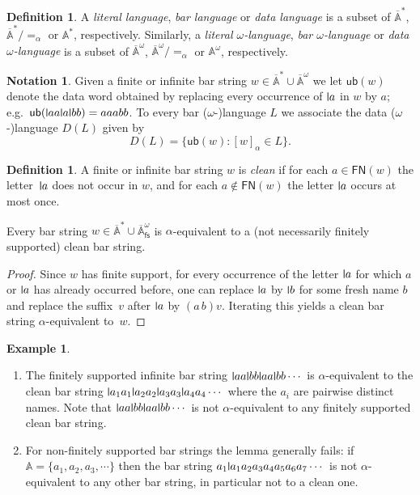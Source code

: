 \documentclass[10pt,a4paper]{amsart}
\newcommand{\midmid}{\hspace{0.2ex}{\rule[-0.1ex]{0.6pt}{1.65ex}}\hspace{0.2ex}}
\newcommand{\compr}{:}
\newcommand{\newletter}[1]{{\midmid}#1}
\newcommand{\free}[1]{\mathsf{FN}(#1)}
\newcommand{\barA}{\overline{\names}}
\newcommand{\ub}{\mathsf{ub}}
\numberwithin{equation}{section}
\newcommand{\fs}{\mathsf{fs}}
\newcommand{\+}[1]{\mathcal{#1}\xspace}
\newcommand{\names}{\mathbb{A}}
\theoremstyle{definition}
\newtheorem{defn}[theorem]{Definition}
\newtheorem{expl}[theorem]{Example}
\newtheorem{nota}[theorem]{Notation}
\begin{document}
\begin{defn}
  A \emph{literal language}, \emph{bar language} or \emph{data
    language} is a subset of $\barA^*$, $\barA^*/{=_\alpha}$ or
  $\names^*$, respectively.  Similarly, a \emph{literal
    $\omega$-language}, \emph{bar $\omega$-language} or \emph{data
    $\omega$-language} is a subset of $\barA^\omega$,
  $\barA^\omega/{=_\alpha}$ or $\names^\omega$, respectively.
\end{defn}
%
\begin{nota}\label{not:local-semantics}
  Given a finite or infinite bar string
  $w\in \barA^*\cup \barA^\omega$ we let $\ub(w)$ denote the data word
  obtained by replacing every occurrence of $\newletter a$ in $w$ by $a$; e.g.\
  $\ub(\newletter aa\newletter a\newletter bb)=aaabb$. To every bar ($\omega$-)language $L$ we associate the data
  ($\omega$-)language $D(L)$ given by
  \[
    D(L) = \{ \ub(w) \compr [w]_\alpha \in L \}.
  \]
\end{nota}
%
\begin{defn}\label{D:clean}
  A finite or infinite bar string $w$ is \emph{clean} if for each
  $a\in \free{w}$ the letter~$\newletter a$ does not occur in $w$, and for each
  $a\not\in \free{w}$ the letter $\newletter a$ occurs at most once.
\end{defn}
%
\begin{lemma}\label{lem:clean}
  Every bar string $w\in \barA^*\cup \barA^\omega_\fs$ is $\alpha$-equivalent to a (not necessarily finitely supported) clean bar string.
\end{lemma}
%
\begin{proof}
  Since $w$ has finite support, for every occurrence of the letter
  $\newletter a$ for which $a$ or $\newletter a$ has already occurred before, one can
  replace $\newletter a$ by $\newletter b$ for some fresh name $b$ and replace the
  suffix~$v$ after $\newletter a$ by $(a\, b)v$. Iterating this %
  yields a clean bar string $\alpha$-equivalent to~$w$.
\end{proof}

\begin{expl}
\begin{enumerate}
\item The finitely supported infinite bar string $\newletter aa\newletter bb\newletter aa\newletter bb\cdots$
  is $\alpha$-equivalent to the clean bar string
  $\newletter a_1a_1\newletter a_2a_2\newletter a_3a_3\newletter a_4a_4\cdots$ where the $a_i$ are pairwise
  distinct names. Note that $\newletter aa\newletter bb\newletter aa\newletter bb\cdots$ is not $\alpha$-equivalent to any finitely supported clean bar string.
  
\item For non-finitely supported bar
  strings the lemma generally fails: if $\names = \{a_1,a_2,a_3,\cdots\}$ then the bar string
  $a_1\newletter a_1a_2a_3a_4a_5a_6a_7\cdots$ is not $\alpha$-equivalent to any other bar string, in particular not to a clean one.
\end{enumerate}
\end{expl}
\end{document}
